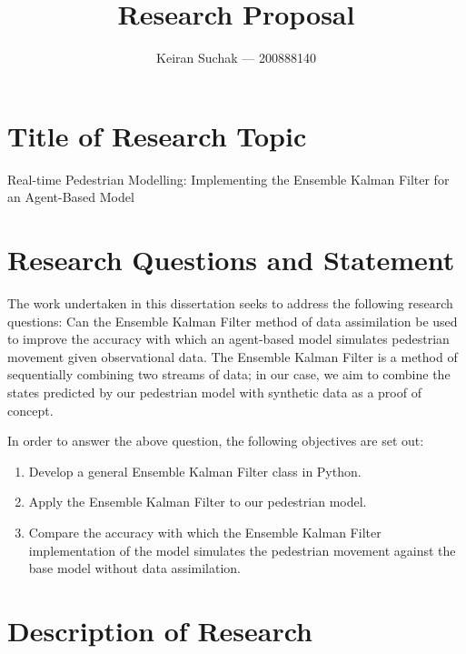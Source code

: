 \documentclass[12pt, twoside, a4paper]{article}
\begin{document}
\title{Research Proposal}
\author{Keiran Suchak --- 200888140}
\maketitle

\section{Title of Research Topic}\label{sec:title}

Real-time Pedestrian Modelling: Implementing the Ensemble Kalman Filter for an
Agent-Based Model

\section{Research Questions and Statement}\label{sec:questions}


The work undertaken in this dissertation seeks to address the following research
questions: Can the Ensemble Kalman Filter method of data assimilation be used to
improve the accuracy with which an agent-based model simulates pedestrian
movement given observational data.
The Ensemble Kalman Filter is a method of sequentially combining two streams of
data; in our case, we aim to combine the states predicted by our pedestrian
model with synthetic data as a proof of concept.

In order to answer the above question, the following objectives are set out:
\begin{enumerate}
    \item Develop a general Ensemble Kalman Filter class in Python.
    \item Apply the Ensemble Kalman Filter to our pedestrian model.
    \item Compare the accuracy with which the Ensemble Kalman Filter
        implementation of the model simulates the pedestrian movement against
        the base model without data assimilation.
\end{enumerate}

\section{Description of Research}\label{sec:research_descr}
\end{document}
